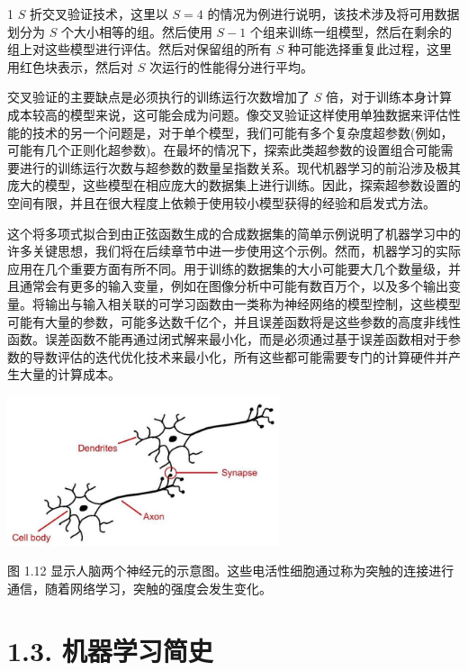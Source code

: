 \documentclass[10pt]{article}
\begin{document}
1 \(S\) 折交叉验证技术，这里以 \(S = 4\) 的情况为例进行说明，该技术涉及将可用数据划分为 \(S\) 个大小相等的组。然后使用 \(S - 1\) 个组来训练一组模型，然后在剩余的组上对这些模型进行评估。然后对保留组的所有 \(S\) 种可能选择重复此过程，这里用红色块表示，然后对 \(S\) 次运行的性能得分进行平均。

交叉验证的主要缺点是必须执行的训练运行次数增加了 \(S\) 倍，对于训练本身计算成本较高的模型来说，这可能会成为问题。像交叉验证这样使用单独数据来评估性能的技术的另一个问题是，对于单个模型，我们可能有多个复杂度超参数(例如，可能有几个正则化超参数)。在最坏的情况下，探索此类超参数的设置组合可能需要进行的训练运行次数与超参数的数量呈指数关系。现代机器学习的前沿涉及极其庞大的模型，这些模型在相应庞大的数据集上进行训练。因此，探索超参数设置的空间有限，并且在很大程度上依赖于使用较小模型获得的经验和启发式方法。

这个将多项式拟合到由正弦函数生成的合成数据集的简单示例说明了机器学习中的许多关键思想，我们将在后续章节中进一步使用这个示例。然而，机器学习的实际应用在几个重要方面有所不同。用于训练的数据集的大小可能要大几个数量级，并且通常会有更多的输入变量，例如在图像分析中可能有数百万个，以及多个输出变量。将输出与输入相关联的可学习函数由一类称为神经网络的模型控制，这些模型可能有大量的参数，可能多达数千亿个，并且误差函数将是这些参数的高度非线性函数。误差函数不能再通过闭式解来最小化，而是必须通过基于误差函数相对于参数的导数评估的迭代优化技术来最小化，所有这些都可能需要专门的计算硬件并产生大量的计算成本。

\begin{center}
\includegraphics[max width=0.6\textwidth]{images/0194e279-9b28-703a-88f4-c3ac21e2010d_35_755_356_776_426_0.jpg}
\end{center}
\hspace*{3em} 

图 1.12 显示人脑两个神经元的示意图。这些电活性细胞通过称为突触的连接进行通信，随着网络学习，突触的强度会发生变化。

\section*{1.3. 机器学习简史}
\end{document}
